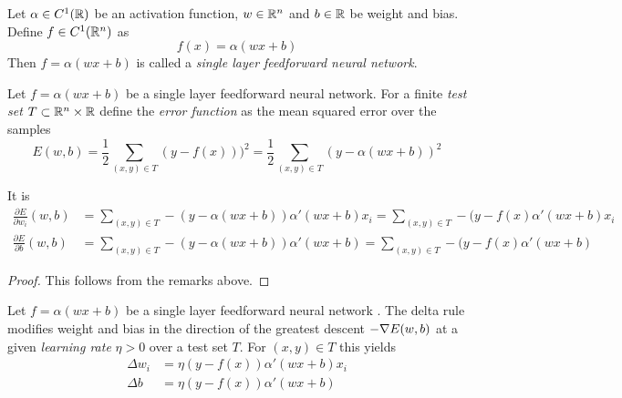 \begin{definition}    
    Let \( \alpha \in C^1(\mathbb{R}) \) be an activation function, \( w \in \mathbb{R}^n \)  and \( b \in \mathbb{R} \)
    be weight and bias. Define \( f \in C^1(\mathbb{R}^n) \) as 
    \[
        f(x) = \alpha(w x + b)
    \]
    Then \( f = \alpha(wx + b) \) is called a \emph{single layer feedforward neural network}.
\end{definition}
\bigskip


\begin{definition}
    Let \( f = \alpha(wx + b) \) be a single layer feedforward neural network.
    For a finite \emph{test set} \( T \subset \mathbb{R}^n \times \mathbb{R} \) define the \emph{error function} 
    as the mean squared error over the samples
    \[
        E(w,b) = \frac{1}{2} \sum_{(x,y) \in T} (y - f(x)))^2 
            = \frac{1}{2} \sum_{(x,y) \in T} (y - \alpha(wx + b))^2
    \]
\end{definition}
\bigskip


\begin{lemma}
    It is
    \[
        \begin{split}
            \frac{\partial E}{\partial w_i}(w, b) 
                &= \sum_{(x,y) \in T} -(y - \alpha(wx + b)) \alpha'(wx + b) x_i 
                = \sum_{(x,y) \in T} -(y - f(x) \alpha'(wx + b) x_i\\
            \frac{\partial E}{\partial b}(w, b) 
                &= \sum_{(x,y) \in T} -(y - \alpha(wx + b)) \alpha'(wx + b)
                =\sum_{(x,y) \in T} -(y - f(x) \alpha'(wx + b)
        \end{split}
    \]
\end{lemma}

\begin{proof}
    This follows from the remarks above.
\end{proof}
\bigskip

\begin{algorithm}\label{algo:delta_rule}
    Let \( f = \alpha(wx + b) \) be a single layer feedforward neural network .
    The delta rule modifies weight and bias in the direction of the greatest descent \( -\nabla E(w,b) \) 
    at a given \emph{learning rate} \( \eta > 0 \) over a test set \( T \).  For \( (x, y) \in T \) this yields
    \[
        \begin{split}
            \Delta w_i & = \eta (y - f(x)) \alpha'(wx + b) x_i \\
            \Delta b & = \eta (y - f(x)) \alpha'(wx + b) 
        \end{split}
    \]
\end{algorithm}
\bigskip



